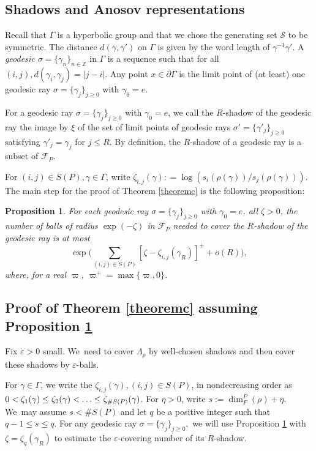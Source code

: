 \documentclass[10pt]{amsart}
\newtheorem{proposition}[theorem]{Proposition}
\newcommand{\Z}{\mathbb{Z}}
\newcommand{\F}{\mathcal{F}}
\newcommand{\cS}{\mathcal{S}}
\let\e\varepsilon
\let\G\Gamma
\let\g\gamma
\let\pp\partial
\let\La\Lambda
\let\s\sigma
\begin{document}
\subsection{Shadows and Anosov representations}

Recall that \(\G\) is a hyperbolic group and that we chose the generating set \(\cS\) to be symmetric. The distance \(d(\g,\g') \) on \(\G\) is given by the word length of \(\g^{-1} \g'\). A {\it{ geodesic }} \(\s = \{\g_n\}_{n \in \Z} \) in \(\G\) is a sequence such that for all \((i,j), d(\g_i, \g_j) =| j-i|\). Any point \(x \in \pp \G\) is the limit point of (at least) one geodesic ray \(\s =\{ \g_j \}_{j \geq 0} \) with \(\g_0 = e\).

For a geodesic ray \(\s =\{ \g_j \}_{j \geq 0} \) with \(\g_0 = e\), we call the \(R\)-shadow of the geodesic ray the image by \(\xi \) of the set of limit points of geodesic rays \(\s ' = \{ \g'_j \}_{j \geq 0} \) satisfying \(\g'_j = \g_j \) for \(j\leq R\). By definition, the \(R\)-shadow of a geodesic ray is a subset of \(\F_{P}\).

For \((i,j) \in S(P),\g \in \G\), write \(\zeta_{i,j}(\g): = \log(s_i(\rho(\gamma))/s_j(\rho(\gamma)))\).
The main step for the proof of Theorem \ref{theoremc} is the following proposition:
\begin{proposition}\label{covering} For each geodesic ray \(\s =\{ \g_j \}_{j \geq 0} \) with \(\g_0 = e\), all \(\zeta >0\), the number of balls of radius \(\exp (-\zeta) \) in \(\F_{P}\) needed to cover the \(R\)-shadow of the geodesic ray is at most
\[
 \exp \biggl(\sum_{(i,j) \in S(P)} [ \zeta - \zeta_{i,j}(\g_R) ]^+ + o(R) \biggr),
\]
where, for a real \(\varpi\), \(\varpi^+ = \max \{ \varpi, 0\} \). \end{proposition}

\subsection{Proof of Theorem \ref{theoremc} assuming Proposition \ref{covering}}

Fix \(\e >0 \) small. We~need to cover \(\La_\rho \) by well-chosen shadows and then cover these shadows by \(\e\)-balls.

For \(\g \in \G\), we write the \(\zeta_{i,j}(\g), (i,j) \in S(P) \), in nondecreasing order as \(0<\nobreak \zeta_1(\g) \leq \zeta_2 (\g) <\ldots \leq \zeta_{\# S(P)} (\g)\). For \(\eta >0\), write \(s:= \dim_F^P (\rho) + \eta \). We~may assume \(s<\#S(P) \) and let \(q\) be a positive integer such that \(q-1 \leq s \leq q \). For any geodesic ray \(\s =\{ \g_j \}_{j \geq 0}, \) we will use Proposition \ref{covering} with \(\zeta = \zeta_q(\g_R) \) to estimate the \(\e\)-covering number of its \(R\)-shadow.
\end{document}
